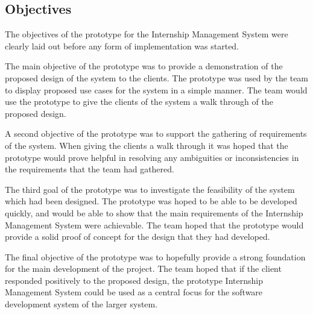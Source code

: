 \subsection{Objectives}

The objectives of the prototype for the Internship Management System were clearly laid out before any form of implementation was started.


The main objective of the prototype was to provide a demonstration of the proposed design of the system to the clients. The prototype was used by the team to display proposed use cases for the system in a simple manner.
The team would use the prototype to give the clients of the system a walk through of the proposed design.


A second objective of the prototype was to support the gathering of requirements of the system. When giving the clients a walk through it was hoped that the prototype would prove helpful in resolving any ambiguities or inconsistencies in the requirements that the team had gathered.


The third goal of the prototype was to investigate the feasibility of the system which had been designed. The prototype was hoped to be able to be developed quickly, and would be able to show that the main requirements of the Internship Management System were achievable. The team hoped that the prototype would provide a solid proof of concept for the design that they had developed.


The final objective of the prototype was to hopefully provide a strong foundation for the main development of the project. The team hoped that if the client responded positively to the proposed design, the prototype Internship Management System could be used as a central focus for the software development system of the larger system.
